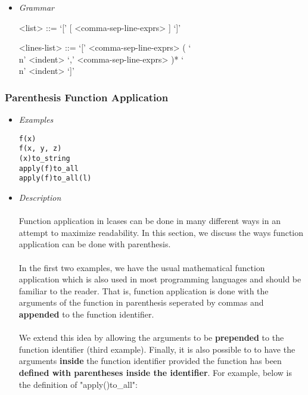 \documentclass{article}
\begin{document}
\begin{itemize}
\item \textit{Grammar}
\begin{grammar}
<list> ::= `[' [ <comma-sep-line-exprs> ] `]'

<lines-list> ::= 
`[' <comma-sep-line-exprs>
( `\\n' <indent> `,' <comma-sep-line-exprs> )*
`\\n' <indent> `]'
\end{grammar}

\end{itemize}

\subsubsection{Parenthesis Function Application}
\label{subsec:parenfuncapp}

\begin{itemize}
\item \textit{Examples}

\begin{verbatim}
f(x)
f(x, y, z)
(x)to_string
apply(f)to_all
apply(f)to_all(l)
\end{verbatim}

\item \textit{Description}
\\\\
Function application in lcases can be done in many different ways in an attempt to 
maximize readability. In this section, we discuss the ways function application can
be done with parenthesis.
\\\\
In the first two examples, we have the usual mathematical
function application which is also used in most programming languages and
should be familiar to the reader. That is, function application is done with the 
arguments of the function in parenthesis seperated by commas and \textbf{appended}
to the function identifier.
\\\\
We extend this idea by allowing the arguments to be \textbf{prepended} to the
function identifier (third example). Finally, it is also possible to to have
the arguments \textbf{inside} the function identifier provided the function has
been \textbf{defined with parentheses inside the identifier}. For example,
below is the definition of "apply()to\_all":


\end{itemize}
\end{document}
